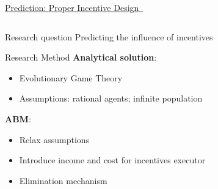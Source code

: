 \documentclass[compress]{beamer}
\begin{document}
\begin{frame}{\href{https://royalsocietypublishing.org/doi/full/10.1098/rspa.2022.0393}{Prediction: Proper Incentive Design~\cite{zhou2022costly}}}
\begin{columns}[c]
\begin{column}{.5\textwidth}
\begin{minipage}{5.8cm}
\begin{block}{Research question}
                    Predicting the influence of incentives
                \end{block}
                \begin{block}{Research Method}
                    \textbf{Analytical solution}:\\
                    \begin{itemize}
                        \item Evolutionary Game Theory
                        \item Assumptions: rational agents; infinite population
                    \end{itemize}
                    \textbf{ABM}:
                    \begin{itemize}
                        \item Relax assumptions
                        \item Introduce income and cost for incentives executor
                        \item Elimination mechanism
                    \end{itemize}
                \end{block}
            \end{minipage}
        \end{column}
    \end{columns}
\end{frame}
\end{document}
